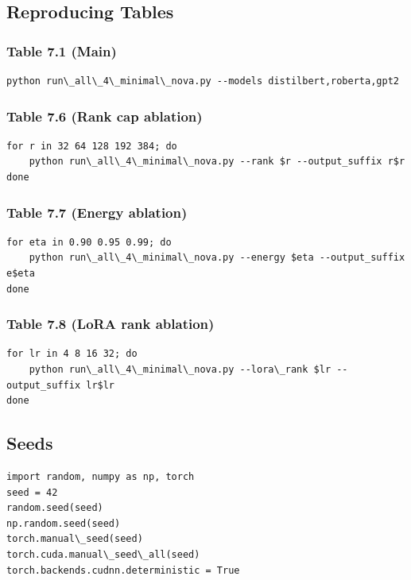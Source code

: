 \subsection{Reproducing Tables}

\subsubsection{Table 7.1 (Main)}

\begin{lstlisting}
python run\_all\_4\_minimal\_nova.py --models distilbert,roberta,gpt2
\end{lstlisting}

\subsubsection{Table 7.6 (Rank cap ablation)}

\begin{lstlisting}
for r in 32 64 128 192 384; do
    python run\_all\_4\_minimal\_nova.py --rank $r --output_suffix r$r
done
\end{lstlisting}

\subsubsection{Table 7.7 (Energy ablation)}

\begin{lstlisting}
for eta in 0.90 0.95 0.99; do
    python run\_all\_4\_minimal\_nova.py --energy $eta --output_suffix e$eta
done
\end{lstlisting}

\subsubsection{Table 7.8 (LoRA rank ablation)}

\begin{lstlisting}
for lr in 4 8 16 32; do
    python run\_all\_4\_minimal\_nova.py --lora\_rank $lr --output_suffix lr$lr
done
\end{lstlisting}

\subsection{Seeds}

\begin{lstlisting}
import random, numpy as np, torch
seed = 42
random.seed(seed)
np.random.seed(seed)
torch.manual\_seed(seed)
torch.cuda.manual\_seed\_all(seed)
torch.backends.cudnn.deterministic = True
\end{lstlisting}

